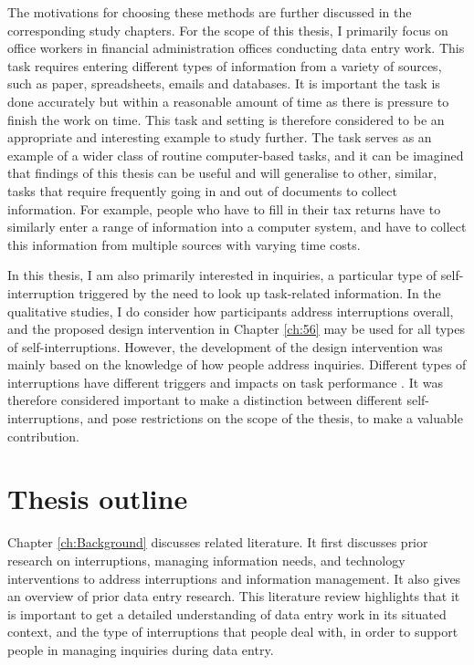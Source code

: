 The motivations for choosing these methods are further discussed in the corresponding study chapters. 
For the scope of this thesis, I primarily focus on office workers in financial administration offices conducting data entry work. This task requires entering different types of information from a variety of sources, such as paper, spreadsheets, emails and databases. It is important the task is done accurately but within a reasonable amount of time as there is pressure to finish the work on time. This task and setting is therefore considered to be an appropriate and interesting example to study further. The task serves as an example of a wider class of routine computer-based tasks, and it can be imagined that findings of this thesis can be useful and will generalise to other, similar, tasks that require frequently going in and out of documents to collect information. For example, people who have to fill in their tax returns have to similarly enter a range of information into a computer system, and have to collect this information from multiple sources with varying time costs.

In this thesis, I am also primarily interested in inquiries, a particular type of self-interruption triggered by the need to look up task-related information. 
In the qualitative studies, I do consider how participants address interruptions overall, and the proposed design intervention in Chapter \ref{ch:56} may be used for all types of self-interruptions. However, the development of the design intervention was mainly based on the knowledge of how people address inquiries. Different types of interruptions have different triggers and impacts on task performance \citep{Jin2009}. It was therefore considered important to make a distinction between different self-interruptions, and pose restrictions on the scope of the thesis, to make a valuable contribution.

\section{Thesis outline}
Chapter \ref{ch:Background} discusses related literature. It first discusses prior research on interruptions, managing information needs, and technology interventions to address interruptions and information management. It also gives an overview of prior data entry research. This literature review highlights that it is important to get a detailed understanding of data entry work in its situated context, and the type of interruptions that people deal with, in order to support people in managing inquiries during data entry. 

